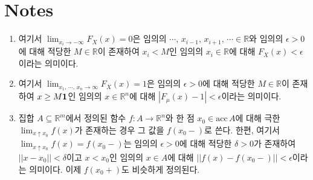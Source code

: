 \section*{Notes}
\footnotesize
\begin{enumerate}[label = \textsf{\textbf{\arabic*}}]
    \item 여기서 $\lim_{x_i\to-\infty}F_X(x)=0$은 임의의 $\cdots,\,x_{i-1},\,x_{i+1},\,\cdots\in\mathbb{R}$와 임의의 $\epsilon>0$에 대해 적당한 $M\in\mathbb{R}$이 존재하여 $x_i<M$인 임의의 $x_i\in\mathbb{R}$에 대해 $F_X(x)<\epsilon$이라는 의미이다.
    \item 여기서 $\lim_{x_1,\,\cdots,\,x_n\to\infty}F_X(x)=1$은 임의의 $\epsilon>0$에 대해 적당한 $M\in\mathbb{R}$이 존재하여 $x\geq M\mathbf{1}$인 임의의 $x\in\mathbb{R}^n$에 대해 $|F_\mu(x)-1|<\epsilon$이라는 의미이다.
    \item 집합 $A\subseteq\mathbb{R}^m$에서 정의된 함수 $f:A\to\mathbb{R}^n$와 한 점 $x_0\in\mathrm{acc}\,A$에 대해 극한 $\lim_{x\uparrow x_0}f(x)$가 존재하는 경우 그 값을 $f(x_0-)$로 쓴다. 한편, 여기서 $\lim_{x\uparrow x_0}f(x)=f(x_0-)$는 임의의 $\epsilon>0$에 대해 적당한 $\delta>0$가 존재하여 $||x-x_0||<\delta$이고 $x<x_0$인 임의의 $x\in A$에 대해 $||f(x)-f(x_0-)||<\epsilon$이라는 의미이다. 이제 $f(x_0+)$도 비슷하게 정의된다.
\end{enumerate}